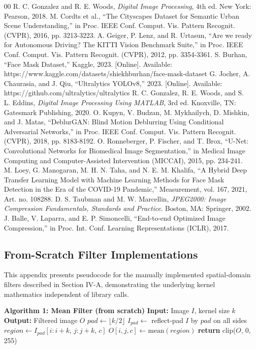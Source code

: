 \documentclass[conference]{IEEEtran}
\begin{document}
\begin{thebibliography}{00}
 R. C. Gonzalez and R. E. Woods, \textit{Digital Image Processing}, 4th ed. New York: Pearson, 2018.
 M. Cordts et al., ``The Cityscapes Dataset for Semantic Urban Scene Understanding,'' in Proc. IEEE Conf. Comput. Vis. Pattern Recognit. (CVPR), 2016, pp. 3213-3223.
 A. Geiger, P. Lenz, and R. Urtasun, ``Are we ready for Autonomous Driving? The KITTI Vision Benchmark Suite,'' in Proc. IEEE Conf. Comput. Vis. Pattern Recognit. (CVPR), 2012, pp. 3354-3361.
 S. Burhan, ``Face Mask Dataset,'' Kaggle, 2023. [Online]. Available: https://www.kaggle.com/datasets/shiekhburhan/face-mask-dataset
 G. Jocher, A. Chaurasia, and J. Qiu, ``Ultralytics YOLOv8,'' 2023. [Online]. Available: https://github.com/ultralytics/ultralytics
 R. C. Gonzalez, R. E. Woods, and S. L. Eddins, \textit{Digital Image Processing Using MATLAB}, 3rd ed. Knoxville, TN: Gatesmark Publishing, 2020.
 O. Kupyn, V. Budzan, M. Mykhailych, D. Mishkin, and J. Matas, ``DeblurGAN: Blind Motion Deblurring Using Conditional Adversarial Networks,'' in Proc. IEEE Conf. Comput. Vis. Pattern Recognit. (CVPR), 2018, pp. 8183-8192.
 O. Ronneberger, P. Fischer, and T. Brox, ``U-Net: Convolutional Networks for Biomedical Image Segmentation,'' in Medical Image Computing and Computer-Assisted Intervention (MICCAI), 2015, pp. 234-241.
 M. Loey, G. Manogaran, M. H. N. Taha, and N. E. M. Khalifa, ``A Hybrid Deep Transfer Learning Model with Machine Learning Methods for Face Mask Detection in the Era of the COVID-19 Pandemic,'' Measurement, vol. 167, 2021, Art. no. 108288.
 D. S. Taubman and M. W. Marcellin, \textit{JPEG2000: Image Compression Fundamentals, Standards and Practice}. Boston, MA: Springer, 2002.
 J. Balle, V. Laparra, and E. P. Simoncelli, ``End-to-end Optimized Image Compression,'' in Proc. Int. Conf. Learning Representations (ICLR), 2017.
\end{thebibliography}

\appendix
\subsection{From-Scratch Filter Implementations}
This appendix presents pseudocode for the manually implemented spatial-domain filters described in Section IV-A, demonstrating the underlying kernel mathematics independent of library calls.

\begin{algorithmic}
\STATE \textbf{Algorithm 1: Mean Filter (from scratch)}
\STATE \textbf{Input:} Image $I$, kernel size $k$
\STATE \textbf{Output:} Filtered image $O$
\STATE $pad \gets \lfloor k/2 \rfloor$
\STATE $I_{pad} \gets$ reflect-pad $I$ by $pad$ on all sides
    \STATE $region \gets I_{pad}[i{:}i{+}k,\, j{:}j{+}k,\, c]$
    \STATE $O[i,j,c] \gets \text{mean}(region)$
\ENDFOR
\STATE \textbf{return} clip($O$, 0, 255)
\end{algorithmic}
\end{document}
